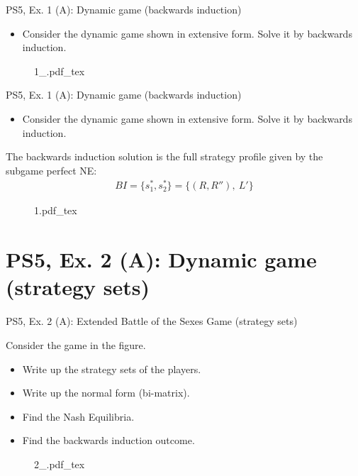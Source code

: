 \begin{frame}{PS5, Ex. 1 (A): Dynamic game (backwards induction)}
  \begin{multicols}{2}
    \begin{itemize}
      \item Consider the dynamic game shown in extensive form. Solve it by backwards induction.
    \end{itemize}
    \vfill\null \columnbreak
    \begin{figure}[!h]
      \center
      \def\svgwidth{.8\columnwidth}
      {1_.pdf_tex}
    \end{figure}
    \vfill\null
  \end{multicols}
\end{frame}

\begin{frame}{PS5, Ex. 1 (A): Dynamic game (backwards induction)}
  \begin{multicols}{2}
    \begin{itemize}
      \item Consider the dynamic game shown in extensive form. Solve it by backwards induction.
    \end{itemize}
    The backwards induction solution is the full strategy profile given by the subgame perfect NE:
    \begin{align*}
      BI=\{s_1^{*},s_2^{*}\}=\{(R, R''),\ L'\}
    \end{align*}
    \vfill\null \columnbreak
    \begin{figure}[!h]
      \center
      \def\svgwidth{.8\columnwidth}
      {1.pdf_tex}
    \end{figure}
    \vfill\null
  \end{multicols}
\end{frame}



\section{PS5, Ex. 2 (A): Dynamic game (strategy sets)}

\begin{frame}{PS5, Ex. 2 (A): Extended Battle of the Sexes Game (strategy sets)}
  \begin{multicols}{2}
    Consider the game in the figure.
    \begin{itemize}
      \item[(a)] Write up the strategy sets of the players.
      \item[(b)] Write up the normal form (bi-matrix).
      \item[(c)] Find the Nash Equilibria.
      \item[(d)] Find the backwards induction outcome.
    \end{itemize}
    \vfill\null \columnbreak
    \begin{figure}[!h]
      \center
      \def\svgwidth{\columnwidth}
      {2_.pdf_tex}
    \end{figure}
    \vfill\null
  \end{multicols}
\end{frame}

